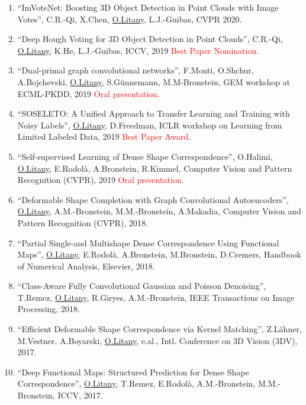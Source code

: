 \begin{enumerate}
\item ``ImVoteNet: Boosting 3D Object Detection in Point Clouds with Image Votes'', C.R.-Qi, X.Chen, \underline{O.Litany}, L.J.-Guibas, CVPR 2020.

\item ``Deep Hough Voting for 3D Object Detection in Point Clouds'', C.R.-Qi, \underline{O.Litany}, K.He, L.J.-Guibas, ICCV, 2019 \textcolor{red}{Best Paper Nomination}.

\item ``Dual-primal graph convolutional networks'', F.Monti, O.Shchur, A.Bojchevski, \underline{O.Litany}, S.Günnemann, M.M-Bronstein, GEM workshop at ECML-PKDD, 2019 \textcolor{red}{Oral presentation}.

\item ``SOSELETO: A Unified Approach to Transfer Learning and Training with Noisy Labels'', \underline{O.Litany}, D.Freedman, ICLR workshop on Learning from Limited Labeled Data, 2019 \textcolor{red}{Best Paper Award}.

\item ``Self-supervised Learning of Dense Shape Correspondence'', O.Halimi, \underline{O.Litany}, E.Rodolà, A.Bronstein, R.Kimmel, Computer Vision and Pattern Recognition (CVPR), 2019 \textcolor{red}{Oral presentation}.

\item ``Deformable Shape Completion with Graph Convolutional Autoencoders'', \underline{O.Litany}, A.M.-Bronstein, M.M.-Bronstein, A.Makadia, Computer Vision and Pattern Recognition (CVPR), 2018.

\item ``Partial Single-and Multishape Dense Correspondence Using Functional Maps'', \underline{O.Litany}, E.Rodolà, A.Bronstein, M.Bronstein, D.Cremers, Handbook of Numerical Analysis, Elsevier, 2018.

\item ``Class-Aware Fully Convolutional Gaussian and Poisson Denoising'', T.Remez, \underline{O.Litany}, R.Giryes, A.M.-Bronstein, IEEE Transactions on Image Processing, 2018.

\item ``Efficient Deformable Shape Correspondence via Kernel Matching'', Z.Lähner, M.Vestner, A.Boyarski, \underline{O.Litany}, e.al., Intl. Conference on 3D Vision (3DV), 2017.

\item ``Deep Functional Maps: Structured Prediction for Dense Shape Correspondence'', \underline{O.Litany}, T.Remez, E.Rodolà, A.M.-Bronstein, M.M.-Bronstein, ICCV, 2017.


\end{enumerate}
